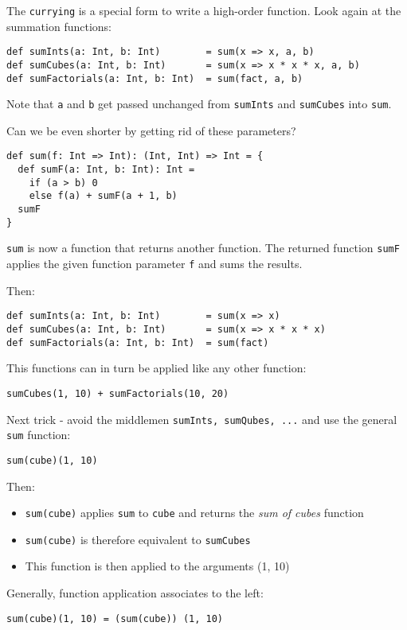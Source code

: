 \documentclass{scrartcl}
\newcommand{\term}[1]{\verb~#1~} %
\begin{document}
The \term{currying} is a special form to write a high-order function. Look again
at the summation functions:
\begin{lstlisting}
def sumInts(a: Int, b: Int)        = sum(x => x, a, b)
def sumCubes(a: Int, b: Int)       = sum(x => x * x * x, a, b)
def sumFactorials(a: Int, b: Int)  = sum(fact, a, b)
\end{lstlisting}
Note that \lstinline|a| and \lstinline|b| get passed unchanged from
\lstinline|sumInts| and \lstinline|sumCubes| into \lstinline|sum|.

Can we be even shorter by getting rid of these parameters?
\begin{lstlisting}
def sum(f: Int => Int): (Int, Int) => Int = {
  def sumF(a: Int, b: Int): Int = 
    if (a > b) 0
    else f(a) + sumF(a + 1, b)
  sumF
}
\end{lstlisting}
\lstinline|sum| is now a function that returns another function. The returned
function \lstinline|sumF| applies the given function parameter \lstinline|f| and
sums the results.

Then:
\begin{lstlisting}
def sumInts(a: Int, b: Int)        = sum(x => x)
def sumCubes(a: Int, b: Int)       = sum(x => x * x * x)
def sumFactorials(a: Int, b: Int)  = sum(fact)
\end{lstlisting}

This functions can in turn be applied like any other function:
\begin{lstlisting}
sumCubes(1, 10) + sumFactorials(10, 20)
\end{lstlisting}

Next trick - avoid the middlemen \lstinline|sumInts, sumQubes, ...| and use the
general \lstinline|sum| function:

\begin{lstlisting}
sum(cube)(1, 10)
\end{lstlisting}
Then:
\begin{itemize}
\item \lstinline|sum(cube)| applies \lstinline|sum| to \lstinline|cube| and
  returns the {\it sum of cubes} function
\item \lstinline|sum(cube)| is therefore equivalent to \lstinline|sumCubes|
\item This function is then applied to the arguments (1, 10)
\end{itemize}

Generally, function application associates to the left:
\begin{lstlisting}
sum(cube)(1, 10) = (sum(cube)) (1, 10)
\end{lstlisting}
\end{document}
